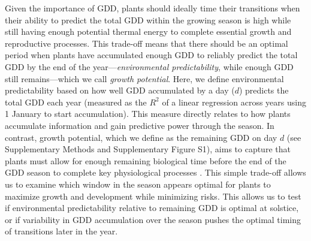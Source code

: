 \documentclass[11pt,letter]{article}
\begin{document}
Given the importance of GDD, %
plants should ideally time their transitions when their ability to predict the total GDD within the growing season is high while still having enough potential thermal energy to complete essential growth and reproductive processes. This trade-off means that there should be an optimal period when plants have accumulated enough GDD
to reliably predict the total GDD by the end of the year---\emph{environmental predictability}, while enough GDD still remains---which we call \emph{growth potential}. Here, we define environmental predictability based on how well GDD accumulated by a day ($d$) predicts the total GDD 
each year (measured as the $R^2$ of a linear regression across years using 1 January to start accumulation). This measure directly relates to how plants accumulate information and gain predictive power through the season. %
In contrast, growth potential, which we define as the remaining GDD on day $d$ (see Supplementary Methods and Supplementary Figure S1), aims to capture that plants must allow for enough remaining biological time before the end of the GDD season to complete key physiological processes \citep{Zohner2023, Journe2024}. %
This simple 
trade-off
allows us to examine which window in the season appears optimal for plants to maximize growth and development while minimizing risks. This allows us to test if environmental predictability relative to remaining GDD is optimal at solstice, or if variability in GDD accumulation over the season pushes the optimal timing of transitions later in the year. 
\end{document}
